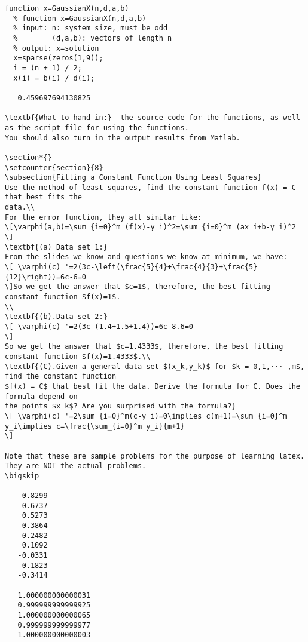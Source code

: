 \begin{verbatim}
function x=GaussianX(n,d,a,b)
  % function x=GaussianX(n,d,a,b)
  % input: n: system size, must be odd
  %        (d,a,b): vectors of length n
  % output: x=solution
  x=sparse(zeros(1,9));
  i = (n + 1) / 2;
  x(i) = b(i) / d(i);

   0.459697694130825

\textbf{What to hand in:}  the source code for the functions, as well as the script file for using the functions.
You should also turn in the output results from Matlab. 

\section*{}
\setcounter{section}{8}
\subsection{Fitting a Constant Function Using Least Squares}
Use the method of least squares, find the constant function f(x) = C that best fits the
data.\\
For the error function, they all similar like:
\[\varphi(a,b)=\sum_{i=0}^m (f(x)-y_i)^2=\sum_{i=0}^m (ax_i+b-y_i)^2 \]
\textbf{(a) Data set 1:} 
From the slides we know and questions we know at minimum, we have:
\[ \varphi(c) '=2(3c-\left(\frac{5}{4}+\frac{4}{3}+\frac{5}{12}\right))=6c-6=0
\]So we get the answer that $c=1$, therefore, the best fitting constant function $f(x)=1$.
\\
\textbf{(b).Data set 2:}
\[ \varphi(c) '=2(3c-(1.4+1.5+1.4))=6c-8.6=0
\]
So we get the answer that $c=1.4333$, therefore, the best fitting constant function $f(x)=1.4333$.\\
\textbf{(C).Given a general data set $(x_k,y_k)$ for $k = 0,1,··· ,m$, find the constant function
$f(x) = C$ that best fit the data. Derive the formula for C. Does the formula depend on
the points $x_k$? Are you surprised with the formula?}
\[ \varphi(c) '=2\sum_{i=0}^m(c-y_i)=0\implies c(m+1)=\sum_{i=0}^m y_i\implies c=\frac{\sum_{i=0}^m y_i}{m+1}
\]

Note that these are sample problems for the purpose of learning latex. They are NOT the actual problems.
\bigskip

    0.8299
    0.6737
    0.5273
    0.3864
    0.2482
    0.1092
   -0.0331
   -0.1823
   -0.3414

   1.000000000000031
   0.999999999999925
   1.000000000000065
   0.999999999999977
   1.000000000000003
\end{verbatim}

